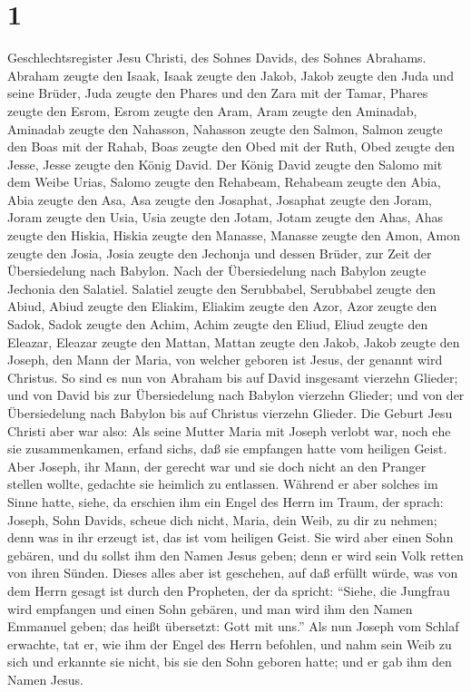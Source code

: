 \hypertarget{section}{%
\section{1}\label{section}}

 Geschlechtsregister Jesu Christi, des Sohnes Davids, des
Sohnes Abrahams.  Abraham zeugte den Isaak, Isaak zeugte
den Jakob, Jakob zeugte den Juda und seine Brüder,  Juda
zeugte den Phares und den Zara mit der Tamar, Phares zeugte den Esrom,
Esrom zeugte den Aram,  Aram zeugte den Aminadab, Aminadab
zeugte den Nahasson, Nahasson zeugte den Salmon,  Salmon
zeugte den Boas mit der Rahab, Boas zeugte den Obed mit der Ruth, Obed
zeugte den Jesse,  Jesse zeugte den König David. Der König
David zeugte den Salomo mit dem Weibe Urias,  Salomo
zeugte den Rehabeam, Rehabeam zeugte den Abia, Abia zeugte den Asa,
 Asa zeugte den Josaphat, Josaphat zeugte den Joram, Joram
zeugte den Usia,  Usia zeugte den Jotam, Jotam zeugte den
Ahas, Ahas zeugte den Hiskia,  Hiskia zeugte den Manasse,
Manasse zeugte den Amon, Amon zeugte den Josia,  Josia
zeugte den Jechonja und dessen Brüder, zur Zeit der Übersiedelung nach
Babylon.  Nach der Übersiedelung nach Babylon zeugte
Jechonia den Salatiel. Salatiel zeugte den Serubbabel, 
Serubbabel zeugte den Abiud, Abiud zeugte den Eliakim, Eliakim zeugte
den Azor,  Azor zeugte den Sadok, Sadok zeugte den Achim,
Achim zeugte den Eliud,  Eliud zeugte den Eleazar,
Eleazar zeugte den Mattan, Mattan zeugte den Jakob, 
Jakob zeugte den Joseph, den Mann der Maria, von welcher geboren ist
Jesus, der genannt wird Christus.  So sind es nun von
Abraham bis auf David insgesamt vierzehn Glieder; und von David bis zur
Übersiedelung nach Babylon vierzehn Glieder; und von der Übersiedelung
nach Babylon bis auf Christus vierzehn Glieder.  Die
Geburt Jesu Christi aber war also: Als seine Mutter Maria mit Joseph
verlobt war, noch ehe sie zusammenkamen, erfand sich\textquotesingle s,
daß sie empfangen hatte vom heiligen Geist.  Aber Joseph,
ihr Mann, der gerecht war und sie doch nicht an den Pranger stellen
wollte, gedachte sie heimlich zu entlassen.  Während er
aber solches im Sinne hatte, siehe, da erschien ihm ein Engel des Herrn
im Traum, der sprach: Joseph, Sohn Davids, scheue dich nicht, Maria,
dein Weib, zu dir zu nehmen; denn was in ihr erzeugt ist, das ist vom
heiligen Geist.  Sie wird aber einen Sohn gebären, und du
sollst ihm den Namen Jesus geben; denn er wird sein Volk retten von
ihren Sünden.  Dieses alles aber ist geschehen, auf daß
erfüllt würde, was von dem Herrn gesagt ist durch den Propheten, der da
spricht:  ``Siehe, die Jungfrau wird empfangen und einen
Sohn gebären, und man wird ihm den Namen Emmanuel geben; das heißt
übersetzt: Gott mit uns.''  Als nun Joseph vom Schlaf
erwachte, tat er, wie ihm der Engel des Herrn befohlen, und nahm sein
Weib zu sich  und erkannte sie nicht, bis sie den Sohn
geboren hatte; und er gab ihm den Namen Jesus.

